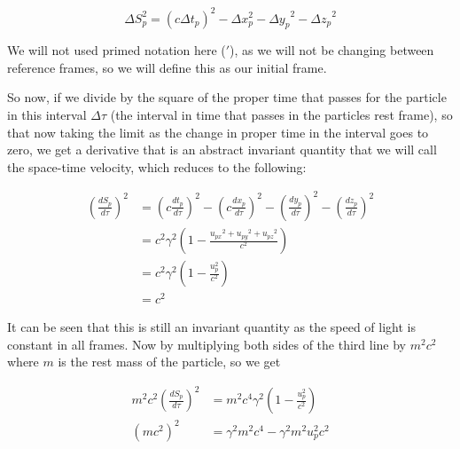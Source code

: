 \begin{equation}
	\Delta S_p^2 = (c\Delta {t}_p)^2-\Delta x_p^2-{\Delta y_p}^2-{\Delta z_p}^2
\end{equation}

We will not used primed notation here ($'$), as we will not be changing between reference frames, so we will define this as our initial frame.

So now, if we divide by the square of the proper time that passes for the particle in this interval ${\Delta\tau}$ (the interval in time that passes in the particles rest frame), so that now taking the limit as the change in proper time in the interval goes to zero, we get a derivative that is an abstract invariant quantity that we will call the space-time velocity, which reduces to the following:

\begin{equation}
	\begin{aligned}
		\left(\frac{dS_p}{d\tau}\right)^2 & = \left(c\frac{{{dt}_{p}}}{d\tau}\right)^2-\left(c\frac{dx_p}{d\tau}\right)^2-\left(\frac{dy_p}{d\tau}\right)^2-\left(\frac{dz_p}{d\tau}\right)^2 \\
		                                  & = {c}^2\gamma^2 \left( 1-\frac{{{u}_{px}}^2 + {{u}_{py}}^2 + {{u}_{pz}}^2}{{c}^2} \right)                                                         \\
		                                  & = {c}^2\gamma^2 \left( 1-\frac{u_p^2}{{c}^2} \right)                                                                                              \\
		                                  & = {c}^2
	\end{aligned}
\end{equation}

It can be seen that this is still an invariant quantity as the speed of light is constant in all frames.
Now by multiplying both sides of the third line by ${m}^2{c}^2$ where $m$ is the rest mass of the particle, so we get

\begin{equation}
	\label{eq: energy-momentum derivation}
	\begin{aligned}
		m^2 {c}^2 \left(\frac{dS_p}{d\tau}\right)^2 & = m^2{c}^4\gamma^2 \left( 1-\frac{u_p^2}{{c}^2} \right) \\
		({m}{c}^2)^2                                & = \gamma^2 m^2 c^4-\gamma^2 m^2 u_p^2 {c}^2
	\end{aligned}
\end{equation}

